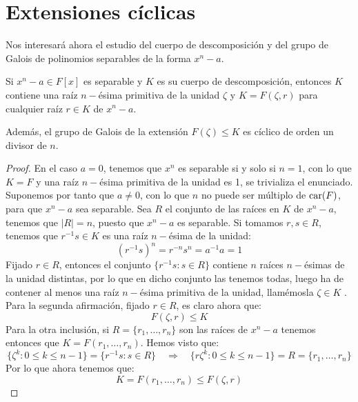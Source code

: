 \section{Extensiones cíclicas}
Nos interesará ahora el estudio del cuerpo de descomposición y del grupo de Galois de polinomios separables de la forma $x^n-a$.

\begin{teo}\label{teo:ext_ciclicas}
    Si $x^n-a\in F[x]$ es separable y $K$ es su cuerpo de descomposición, entonces $K$ contiene una raíz $n-$ésima primitiva de la unidad $\zeta$ y $K = F(\zeta, r)$ para cualquier raíz $r\in K$ de $x^n-a$.

    \noindent
    Además, el grupo de Galois de la extensión $F(\zeta)\leq K$ es cíclico de orden un divisor de $n$.
    \begin{proof}
        En el caso $a = 0$, tenemos que $x^n$ es separable si y solo si $n = 1$, con lo que $K = F$ y una raíz $n-$ésima primitiva de la unidad es 1, se trivializa el enunciado.\\

        \noindent
        Suponemos por tanto que $a\neq 0$, con lo que $n$ no puede ser múltiplo de $\operatorname{car}(F)$, para que $x^n-a$ sea separable. Sea $R$ el conjunto de las raíces en $K$ de $x^n-a$, tenemos que $|R| = n$, puesto que $x^n-a$ es separable. Si tomamos $r,s\in R$, tenemos que $r^{-1}s\in K$ es una raíz $n-$ésima de la unidad: 
        \begin{equation*}
            {(r^{-1}s)}^{n} = r^{-n}s^n = a^{-1}a = 1
        \end{equation*}
        Fijado $r\in R$, entonces el conjunto $\{r^{-1}s : s\in R\}$ contiene $n$ raíces $n-$ésimas de la unidad distintas, por lo que en dicho conjunto las tenemos todas, luego ha de contener al menos una raíz $n-$ésima primitiva de la unidad, llamémosla $\zeta\in K$ .\\

        \noindent
        Para la segunda afirmación, fijado $r\in R$, es claro ahora que:
        \begin{equation*}
            F(\zeta, r)\leq K
        \end{equation*}
        Para la otra inclusión, si $R=\{r_1,\ldots,r_n\}$ son las raíces de $x^n-a$ tenemos entonces que $K = F(r_1,\ldots,r_n)$. Hemos visto que:
        \begin{equation*}
            \{\zeta^k : 0\leq k \leq n-1\} = \{r^{-1}s:s\in R\} \quad\Longrightarrow\quad \{r\zeta^k : 0\leq k\leq n-1\} = R = \{r_1,\ldots,r_n\}
        \end{equation*}
        Por lo que ahora tenemos que:
        \begin{equation*}
            K = F(r_1,\ldots,r_n) \leq F(\zeta,r)
        \end{equation*}


\end{proof}
\end{teo}
